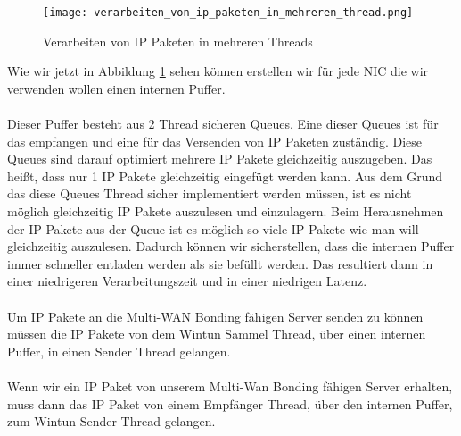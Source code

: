 \begin{figure}[H]
    \centering
    \texttt{[image: verarbeiten\_von\_ip\_paketen\_in\_mehreren\_thread.png]}
    \caption[Verarbeiten von IP Paketen in mehreren Threads]{Verarbeiten von IP Paketen in mehreren Threads}
    \label{driver-process-pakets-many-threads}
\end{figure}
\noindent
Wie wir jetzt in Abbildung \ref{driver-process-pakets-many-threads} sehen können erstellen wir für jede NIC die wir verwenden wollen einen internen Puffer.
\\\\
Dieser Puffer besteht aus 2 Thread sicheren Queues. Eine dieser Queues ist für das empfangen und eine für das Versenden von IP Paketen zuständig. Diese Queues sind darauf optimiert mehrere IP Pakete gleichzeitig auszugeben. Das heißt, dass nur 1 IP Pakete gleichzeitig eingefügt werden kann. Aus dem Grund das diese Queues Thread sicher implementiert werden müssen, ist es nicht möglich gleichzeitig IP Pakete auszulesen und einzulagern. Beim Herausnehmen der IP Pakete aus der Queue ist es möglich so viele IP Pakete wie man will gleichzeitig auszulesen. Dadurch können wir sicherstellen, dass die internen Puffer immer schneller entladen werden als sie befüllt werden. Das resultiert dann in einer niedrigeren Verarbeitungszeit und in einer niedrigen Latenz.
\\\\
Um IP Pakete an die Multi-WAN Bonding fähigen Server senden zu können müssen die IP Pakete von dem Wintun Sammel Thread, über einen internen Puffer, in einen Sender Thread gelangen. 
\\\\
Wenn wir ein IP Paket von unserem Multi-Wan Bonding fähigen Server erhalten, muss dann das IP Paket von einem Empfänger Thread, über den internen Puffer, zum Wintun Sender Thread gelangen.

